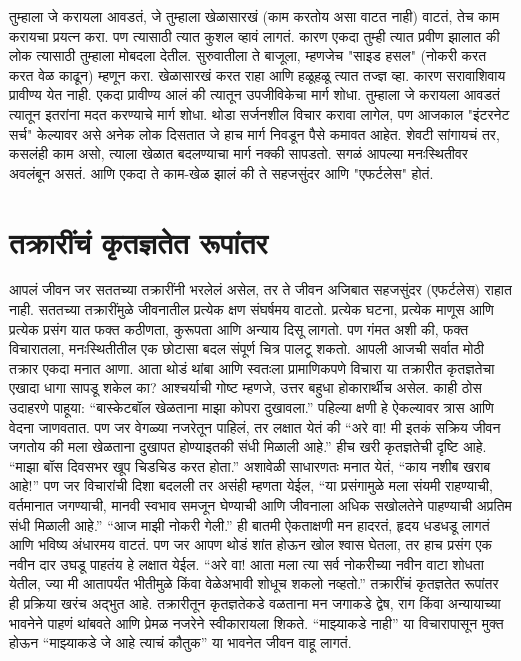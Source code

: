तुम्हाला जे करायला आवडतं, जे तुम्हाला खेळासारखं (काम करतोय असा वाटत नाही) वाटतं, तेच काम करायचा प्रयत्न करा. पण त्यासाठी त्यात कुशल व्हावं लागतं. कारण एकदा तुम्ही त्यात प्रवीण झालात की लोक त्यासाठी तुम्हाला मोबदला देतील. सुरुवातीला ते बाजूला, म्हणजेच "साइड हसल" (नोकरी करत करत वेळ काढून) म्हणून करा. खेळासारखं करत राहा आणि हळूहळू त्यात तज्ज्ञ व्हा. कारण सरावाशिवाय प्रावीण्य येत नाही.
एकदा प्रावीण्य आलं की त्यातून उपजीविकेचा मार्ग शोधा. तुम्हाला जे करायला आवडतं त्यातून इतरांना मदत करण्याचे मार्ग शोधा. थोडा सर्जनशील विचार करावा लागेल, पण आजकाल "इंटरनेट सर्च" केल्यावर असे अनेक लोक दिसतात जे हाच मार्ग निवडून पैसे कमावत आहेत.
शेवटी सांगायचं तर, कसलंही काम असो, त्याला खेळात बदलण्याचा मार्ग नक्की सापडतो. सगळं आपल्या मनःस्थितीवर अवलंबून असतं. आणि एकदा ते काम-खेळ झालं की ते सहजसुंदर आणि "एफर्टलेस" होतं.
 \chapter{तक्रारींचं कृतज्ञतेत रूपांतर}
आपलं जीवन जर सततच्या तक्रारींनी भरलेलं असेल, तर ते जीवन अजिबात सहजसुंदर (एफर्टलेस) राहात नाही. सततच्या तक्रारींमुळे जीवनातील प्रत्येक क्षण संघर्षमय वाटतो. प्रत्येक घटना, प्रत्येक माणूस आणि प्रत्येक प्रसंग यात फक्त कठीणता, कुरूपता आणि अन्याय दिसू लागतो. पण गंमत अशी की, फक्त विचारातला, मनःस्थितीतील एक छोटासा बदल संपूर्ण चित्र पालटू शकतो.
आपली आजची सर्वात मोठी तक्रार एकदा मनात आणा. आता थोडं थांबा आणि स्वतःला प्रामाणिकपणे विचारा या तक्रारीत कृतज्ञतेचा एखादा धागा सापडू शकेल का? आश्चर्याची गोष्ट म्हणजे, उत्तर बहुधा होकारार्थीच असेल. काही ठोस उदाहरणे पाहूया:
“बास्केटबॉल खेळताना माझा कोपरा दुखावला.” पहिल्या क्षणी हे ऐकल्यावर त्रास आणि वेदना जाणवतात. पण जर वेगळ्या नजरेतून पाहिलं, तर लक्षात येतं की  “अरे वा! मी इतकं सक्रिय जीवन जगतोय की मला खेळताना दुखापत होण्याइतकी संधी मिळाली आहे.” हीच खरी कृतज्ञतेची दृष्टि आहे.
“माझा बॉस दिवसभर खूप चिडचिड करत होता.” अशावेळी साधारणतः मनात येतं, “काय नशीब खराब आहे!” पण जर विचारांची दिशा बदलली तर असंही म्हणता येईल,  “या प्रसंगामुळे मला संयमी राहण्याची, वर्तमानात जगण्याची, मानवी स्वभाव समजून घेण्याची आणि जीवनाला अधिक सखोलतेने पाहण्याची अप्रतिम संधी मिळाली आहे.”
“आज माझी नोकरी गेली.” ही बातमी ऐकताक्षणी मन हादरतं, हृदय धडधडू लागतं आणि भविष्य अंधारमय वाटतं. पण जर आपण थोडं शांत होऊन खोल श्वास घेतला, तर हाच प्रसंग एक नवीन दार उघडू पाहतंय हे लक्षात येईल. “अरे वा! आता मला त्या सर्व नोकरीच्या नवीन वाटा शोधता येतील, ज्या मी आतापर्यंत भीतीमुळे किंवा वेळेअभावी शोधूच शकलो नव्हतो.”
तक्रारींचं कृतज्ञतेत रूपांतर ही प्रक्रिया खरंच अद्भुत आहे. तक्रारीतून कृतज्ञतेकडे वळताना मन जगाकडे द्वेष, राग किंवा अन्यायाच्या भावनेने पाहणं थांबवते आणि प्रेमळ नजरेने स्वीकारायला शिकते. “माझ्याकडे नाही” या विचारापासून मुक्त होऊन “माझ्याकडे जे आहे त्याचं कौतुक” या भावनेत जीवन वाहू लागतं.

